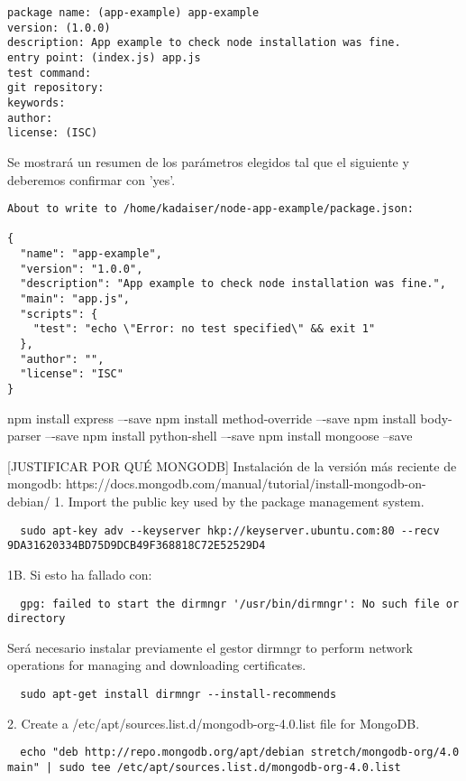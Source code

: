 \begin{verbatim}
package name: (app-example) app-example
version: (1.0.0)
description: App example to check node installation was fine.
entry point: (index.js) app.js
test command:
git repository:
keywords:
author:
license: (ISC)
\end{verbatim}

Se mostrará un resumen de los parámetros elegidos tal que el siguiente y deberemos confirmar con 'yes'.

\begin{verbatim}
About to write to /home/kadaiser/node-app-example/package.json:

{
  "name": "app-example",
  "version": "1.0.0",
  "description": "App example to check node installation was fine.",
  "main": "app.js",
  "scripts": {
    "test": "echo \"Error: no test specified\" && exit 1"
  },
  "author": "",
  "license": "ISC"
}
\end{verbatim}

npm install express –-save
npm install method-override –-save
npm install body-parser –-save
npm install python-shell –-save
npm install mongoose --save


[JUSTIFICAR POR QUÉ MONGODB]
Instalación de la versión más reciente de mongodb:
https://docs.mongodb.com/manual/tutorial/install-mongodb-on-debian/
1. Import the public key used by the package management system.
\begin{verbatim}
  sudo apt-key adv --keyserver hkp://keyserver.ubuntu.com:80 --recv 9DA31620334BD75D9DCB49F368818C72E52529D4
\end{verbatim}

1B. Si esto ha fallado con:
\begin{verbatim}
  gpg: failed to start the dirmngr '/usr/bin/dirmngr': No such file or directory
\end{verbatim}
Será necesario instalar previamente el gestor dirmngr to perform network operations for managing and downloading certificates.
\begin{verbatim}
  sudo apt-get install dirmngr --install-recommends
\end{verbatim}

2. Create a /etc/apt/sources.list.d/mongodb-org-4.0.list file for MongoDB.
\begin{verbatim}
  echo "deb http://repo.mongodb.org/apt/debian stretch/mongodb-org/4.0 main" | sudo tee /etc/apt/sources.list.d/mongodb-org-4.0.list
\end{verbatim}

